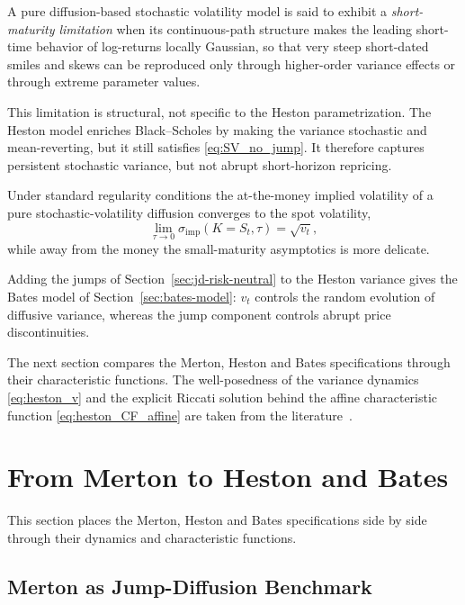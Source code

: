 \begin{definition}\label{def:sv-short-maturity}

A pure diffusion-based stochastic volatility model is said to exhibit a
\emph{short-maturity limitation} when its continuous-path structure makes
the leading short-time behavior of log-returns locally Gaussian, so that
very steep short-dated smiles and skews can be reproduced only through
higher-order variance effects or through extreme parameter values.
\end{definition}

This limitation is structural, not specific to the Heston
parametrization.  The Heston model enriches Black--Scholes by making the
variance stochastic and mean-reverting, but it still satisfies
\eqref{eq:SV_no_jump}.  It therefore captures persistent stochastic
variance, but not abrupt short-horizon repricing.

Under standard regularity conditions the at-the-money implied volatility of
a pure stochastic-volatility diffusion converges to the spot volatility,
\[
\lim_{\tau\to 0} \sigma_{\mathrm{imp}}(K=S_t,\tau) = \sqrt{v_t},
\]
while away from the money the small-maturity asymptotics is more delicate.

Adding the jumps of Section~\ref{sec:jd-risk-neutral} to the Heston variance
gives the Bates model of Section~\ref{sec:bates-model}: $v_t$ controls the
random evolution of diffusive variance, whereas the jump component controls
abrupt price discontinuities.

The next section compares the Merton, Heston and Bates specifications
through their characteristic functions. The well-posedness of the variance
dynamics \eqref{eq:heston_v} and the explicit Riccati solution behind the
affine characteristic function \eqref{eq:heston_CF_affine} are taken from
the literature~\cite{CoxIngersollRoss1985,Heston1993,DuffiePanSingleton2000}.


\section{From Merton to Heston and Bates}

This section places the Merton, Heston and Bates specifications side by side through their dynamics and characteristic functions.
\subsection{Merton as Jump-Diffusion Benchmark}

